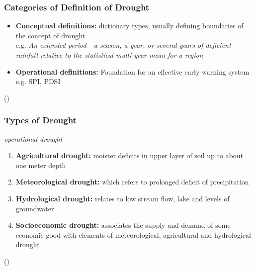 \documentclass{beamer}              %
\begin{document}

\begin{frame}\label{Definition of Drought}
\frametitle{Categories of Definition of Drought} 
 \begin{itemize}


\item \textbf{Conceptual definitions:} dictionary types, usually defining boundaries of the concept of drought \\ 
e.g. \textit{An extended period - a season, a year, or several years of deficient rainfall relative to the statistical multi-year mean for a region \citep{schneider1996}}
\item \textbf{Operational definitions:} Foundation for an effective early warning system \\ e.g. SPI, PDSI

\end{itemize} 

(\citealp{wilhite1985,wilhite2000})
\end{frame}



\begin{frame}
\frametitle{Types of Drought}
\textit{operational drought} \\
  \begin{enumerate}
      \item \textbf{Agricultural drought:} moister deficits in upper layer of
soil up to about one meter depth
      \item \textbf{Meteorological drought:} which refers to prolonged
deficit of precipitation
      \item \textbf{Hydrological drought:} relates to low stream flow, lake and levels of groundwater
      \item \textbf{Socioeconomic drought:} associates the supply and demand of some economic good with elements of meteorological, agricultural and hydrological drought
  \end{enumerate}
  (\citealp{heim2002,IPCCtrenberth,AMS2013})
\end{frame}
\end{document}
